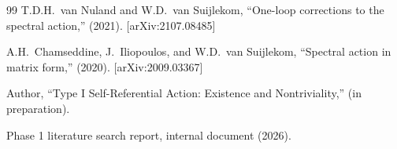 \documentclass[11pt,a4paper]{article}
\theoremstyle{remark}
\begin{document}
\begin{thebibliography}{99}
 T.D.H.~van Nuland and W.D.~van Suijlekom, ``One-loop corrections to the spectral action,'' (2021). [arXiv:2107.08485]

 A.H.~Chamseddine, J.~Iliopoulos, and W.D.~van Suijlekom, ``Spectral action in matrix form,'' (2020). [arXiv:2009.03367]

 Author, ``Type I Self-Referential Action: Existence and Nontriviality,'' (in preparation).

 Phase 1 literature search report, internal document (2026).

\end{thebibliography}
\end{document}

